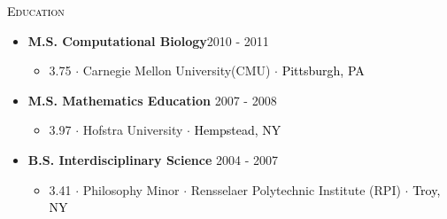 \begin{minipage}{\firstWidth}
\large \textcolor{Black}{\textsc{Education}}
\end{minipage}
\begin{minipage}{\secondWidth}
\begin{itemize}
\item{\textbf{M.S. Computational Biology}\hfill 2010 - 2011}
    \begin{itemize}
    \item{3.75 $\cdot$ Carnegie Mellon University(CMU) $\cdot$ \textcolor{Black}{Pittsburgh, PA}} 
    \end{itemize}
\item{\textbf{M.S. Mathematics Education} \hfill  2007 - 2008}
    \begin{itemize}
    \item{3.97 $\cdot$ Hofstra University $\cdot$ \textcolor{Black}{Hempstead, NY}}
    \end{itemize}
\item{\textbf{B.S. Interdisciplinary Science} \hfill2004 - 2007}
    \begin{itemize}
    \item{ 3.41 $\cdot$ Philosophy Minor $\cdot$ Rensselaer Polytechnic Institute (RPI) $\cdot$ \textcolor{Black}{Troy, NY}}
    \end{itemize}
\end{itemize}
\end{minipage}

